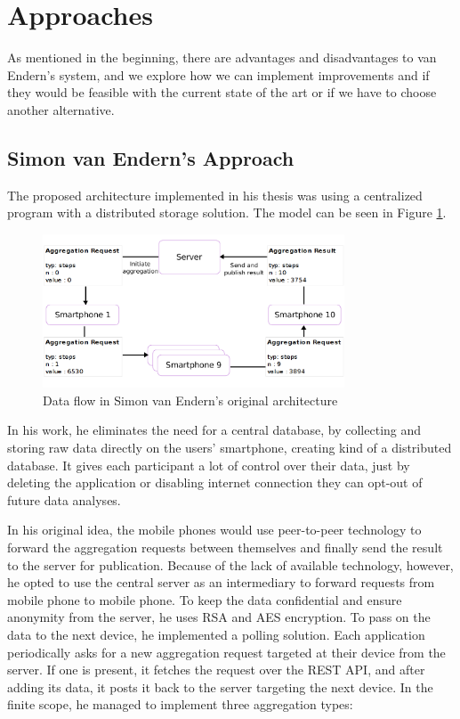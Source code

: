 \section{Approaches}
As mentioned in the beginning, there are advantages and disadvantages to van Endern's \cite{simon} system, and we explore how we can implement improvements and if they would be feasible with the current state of the art or if we have to choose another alternative.

\subsection{Simon van Endern's Approach}
The proposed architecture implemented in his thesis was using a centralized program with a distributed storage solution. The model can be seen in Figure \ref{fig:simon_original}.

\begin{figure}[htpb]
  \centering
  \includegraphics[width=0.8\textwidth]{figures/simon_original.png}
  \caption{Data flow in Simon van Endern's original architecture \cite{simon}} \label{fig:simon_original}
\end{figure}

In his work, he eliminates the need for a central database, by collecting and storing raw data directly on the users' smartphone, creating kind of a distributed database. It gives each participant a lot of control over their data, just by deleting the application or disabling internet connection they can opt-out of future data analyses.

In his original idea, the mobile phones would use peer-to-peer technology to forward the aggregation requests between themselves and finally send the result to the server for publication. Because of the lack of available technology, however, he opted to use the central server as an intermediary to forward requests from mobile phone to mobile phone. To keep the data confidential and ensure anonymity from the server, he uses RSA and AES encryption. To pass on the data to the next device, he implemented a polling solution. Each application periodically asks for a new aggregation request targeted at their device from the server. If one is present, it fetches the request over the REST API, and after adding its data, it posts it back to the server targeting the next device.
In the finite scope, he managed to implement three aggregation types:

